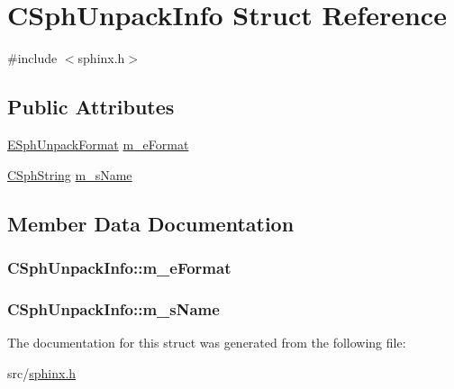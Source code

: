 \hypertarget{structCSphUnpackInfo}{\section{C\-Sph\-Unpack\-Info Struct Reference}
\label{structCSphUnpackInfo}
}


{\ttfamily \#include $<$sphinx.\-h$>$}

\subsection*{Public Attributes}
\begin{DoxyCompactItemize}
\item 
\hyperlink{sphinx_8h_a4d4996a14f2199e251e4f55ac3d302f0}{E\-Sph\-Unpack\-Format} \hyperlink{structCSphUnpackInfo_a60d24233f92e3079b1f499d345d17635}{m\-\_\-e\-Format}
\item 
\hyperlink{structCSphString}{C\-Sph\-String} \hyperlink{structCSphUnpackInfo_a92446f2e73e67cbccc56ff95dc277643}{m\-\_\-s\-Name}
\end{DoxyCompactItemize}


\subsection{Member Data Documentation}
\hypertarget{structCSphUnpackInfo_a60d24233f92e3079b1f499d345d17635}{
\subsubsection[{m\-\_\-e\-Format}]{ C\-Sph\-Unpack\-Info\-::m\-\_\-e\-Format}}\label{structCSphUnpackInfo_a60d24233f92e3079b1f499d345d17635}
\hypertarget{structCSphUnpackInfo_a92446f2e73e67cbccc56ff95dc277643}{
\subsubsection[{m\-\_\-s\-Name}]{ C\-Sph\-Unpack\-Info\-::m\-\_\-s\-Name}}\label{structCSphUnpackInfo_a92446f2e73e67cbccc56ff95dc277643}


The documentation for this struct was generated from the following file\-:\begin{DoxyCompactItemize}
\item 
src/\hyperlink{sphinx_8h}{sphinx.\-h}\end{DoxyCompactItemize}
